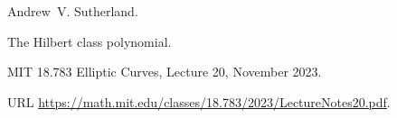 Andrew~V. Sutherland.

\newblock The {Hilbert} class polynomial.

\newblock MIT 18.783 Elliptic Curves, Lecture 20, November 2023.

\newblock URL
  \url{https://math.mit.edu/classes/18.783/2023/LectureNotes20.pdf}.
